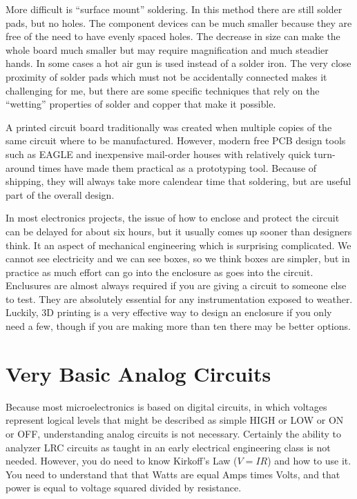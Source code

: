 \documentclass[
	fontsize=10pt, %
	twoside=false, %
	secnumdepth=1, %
]{kaobook}
\begin{document}
More difficult is ``surface mount'' soldering. In this method
there are still solder pads, but no holes. The component devices
can be much smaller because they are free of the need to have
evenly spaced holes. The decrease in size can make the whole board
much smaller but may require magnification and much steadier hands.
In some cases a hot air gun is used instead of a solder iron.
The very close proximity of solder pads which must not be accidentally
connected makes it challenging for me, but there are some specific
techniques that rely on the ``wetting'' properties of solder and
copper that make it possible.

A printed circuit board traditionally was created when multiple copies of the same
circuit where to be manufactured. However, modern free PCB design
tools such as EAGLE\cite{eaglecad} and inexpensive mail-order houses with
relatively quick turn-around times have made them practical
as a prototyping tool. Because of shipping, they will always
take more calendear time that soldering, but are useful part of the
overall design.

In most electronics projects, the issue of how to enclose and
protect the circuit can be delayed for about six hours, but
it usually comes up sooner than designers think. It an aspect
of mechanical engineering which is surprising complicated.
We cannot see electricity and we can see boxes, so we think
boxes are simpler, but in practice as much effort can go into
the enclosure as goes into the circuit. Enclusures are almost
always required if you are giving a circuit to someone else to
test. They are absolutely essential for any instrumentation
exposed to weather. Luckily, 3D printing is a very effective
way to design an enclosure if you only need a few, though
if you are making more than ten there may be better options.

\section{Very Basic Analog Circuits}

Because most microelectronics is based on digital circuits,
in which voltages represent logical levels that might be
described as simple HIGH or LOW or ON or OFF, understanding
analog circuits is not necessary.
Certainly the ability to analyzer LRC circuits as taught
in an early electrical engineering class is not needed.
However, you do need to know Kirkoff's Law ($ V= IR$) and how to
use it. You need to understand that that Watts are equal
Amps times Volts, and that power is equal to voltage squared
divided by resistance.
\end{document}
